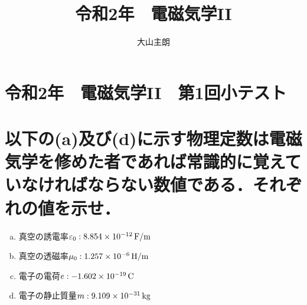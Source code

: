 \documentclass[dvipdfmx]{ujarticle}
\begin{document}
\title{令和2年　電磁気学II}
\date{}
\author{大山主朗}

\maketitle

\section*{令和2年　電磁気学II　第1回小テスト}
\section{以下の(a)及び(d)に示す物理定数は電磁気学を修めた者であれば常識的に覚えていなければならない数値である．それぞれの値を示せ．}
\begin{enumerate}[(a)]
	\item 真空の誘電率$\varepsilon_{0}:8.854 \times 10^{-12}\,\rm{F/m}$
	\item 真空の透磁率$\mu_{0}:1.257 \times 10^{-6}\,\rm{H/m}$
	\item 電子の電荷$e:-1.602 \times 10^{-19}\,\rm{C}$
	\item 電子の静止質量$m:9.109\times 10^{-31}\,\rm{kg}$
\end{enumerate}
\end{document}
